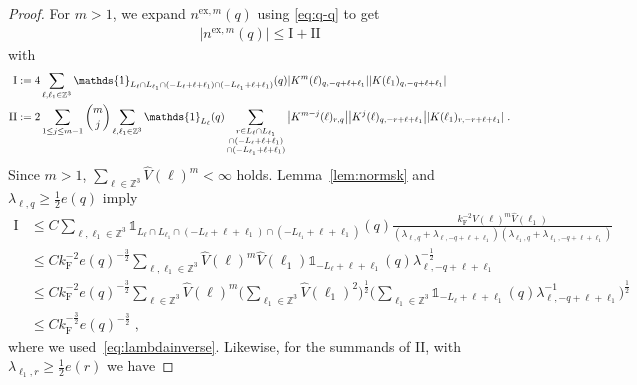 \documentclass[12pt,a4paper]{article}
\numberwithin{equation}{section}
\newcommand{\1}{\mathbb{I}}
\newcommand{\ex}{\mathrm{ex}}
\newcommand{\F}{\mathrm{F}}
\newcommand{\I}{\mathrm{I}}
\newcommand{\II}{\mathrm{II}}
\newcommand{\kF}{k_\F}
\newcommand{\Zstar}{\mathbb{Z}^3} %
\newcommand{\Z}{\mathbb{Z}}
\newcommand{\half}{\frac{1}{2}}
\theoremstyle{plain}
\theoremstyle{definition}
\theoremstyle{remark}
\theoremstyle{plain}
\theoremstyle{definition}
\theoremstyle{remark}
\begin{document}
\begin{proof}
For $ m > 1 $, we expand $ n^{\ex,m}(q) $ using \eqref{eq:q-q} to get
\begin{equation}
\begin{aligned}
	|n^{\ex,m}(q)|
	\leq \I + \II
\end{aligned}
\end{equation}
with
\begin{displaymath}
\begin{aligned}
	\I
	&:= 4 \sum_{\ell,\ell_1 \in \Zstar}
		\mathds{1}_{L_\ell \cap L_{\ell_1} \cap (-L_\ell + \ell + \ell_1) \cap (-L_{\ell_1} + \ell + \ell_1)}(q)
		\abs{K^m(\ell)_{q,-q+\ell+\ell_1}}
		\abs{K(\ell_1)_{q,-q+\ell+\ell_1}} \\
	\II
	&:= 2 \sum_{1 \le j \le m-1} {{m}\choose j} \sum_{\ell,\ell_1 \in \Zstar}
		\mathds{1}_{L_\ell}(q)
		\sum_{\substack{r\in L_{\ell} \cap L_{\ell_1}\\ \cap (-L_{\ell}+\ell+\ell_1) \\ \cap (-L_{\ell_1}+\ell+\ell_1 )}}
		\abs{K^{m-j}(\ell)_{r,q}}
		\abs{K^j(\ell)_{q,-r+\ell+\ell_1}}
		\abs{K(\ell_1)_{r,-r+\ell+\ell_1}} \;.
\end{aligned}
\end{displaymath}
Since $ m > 1 $, $ \sum_{\ell \in \Zstar} \hat{V}(\ell)^m < \infty $ holds. Lemma~\ref{lem:normsk} and $  \lambda_{\ell,q} \geq \frac{1}{2} e(q) $ imply
\begin{align}
	\I
	&\leq C \sum_{\ell,\ell_1 \in \Zstar}
		\mathds{1}_{L_\ell \cap L_{\ell_1} \cap (-L_\ell + \ell + \ell_1) \cap (-L_{\ell_1} + \ell + \ell_1)}(q)
		\frac{\kF^{-2} \hat{V}(\ell)^m \hat{V}(\ell_1)}{(\lambda_{\ell,q} + \lambda_{\ell,-q+\ell+\ell_1}) (\lambda_{\ell_1,q} + \lambda_{\ell_1,-q+\ell+\ell_1})} \nonumber\\
	&\leq C \kF^{-2} e(q)^{-\frac 32} \sum_{\ell,\ell_1 \in \Zstar} \hat{V}(\ell)^m \hat{V}(\ell_1)
		\mathds{1}_{-L_\ell + \ell + \ell_1}(q)
		\lambda_{\ell,-q+\ell+\ell_1}^{-\frac 12} \nonumber\\ 
	&\leq C \kF^{-2} e(q)^{-\frac 32} \sum_{\ell \in \Zstar} \hat{V}(\ell)^m
		\Bigg( \sum_{\ell_1 \in \Zstar} \hat{V}(\ell_1)^2 \Bigg)^{\half}
		\Bigg( \sum_{\ell_1 \in \Z^3} \mathds{1}_{-L_\ell + \ell + \ell_1}(q)
		\lambda_{\ell,-q+\ell+\ell_1}^{-1} \Bigg)^{\half} \nonumber\\
	&\leq C \kF^{-\frac 32} e(q)^{-\frac 32} \;,
\end{align}
where we used~\eqref{eq:lambdainverse}. Likewise, for the summands of $ \II $, with $ \lambda_{\ell_1,r} \ge \frac{1}{2} e(r) $ we have

\end{proof}
\end{document}
